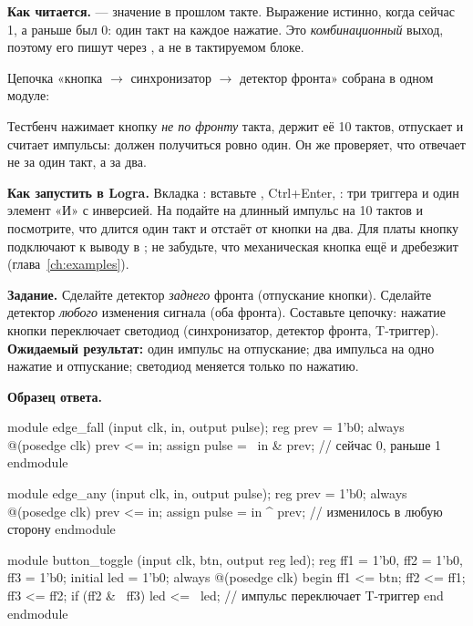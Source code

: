 \textbf{Как читается.}  --- значение  в прошлом такте.
Выражение  истинно, когда сейчас 1, а раньше
был 0: один такт на каждое нажатие. Это \emph{комбинационный} выход,
поэтому его пишут через , а не в тактируемом блоке.

Цепочка «кнопка $\to$ синхронизатор $\to$ детектор фронта» собрана в одном
модуле:


Тестбенч  нажимает кнопку \emph{не по фронту}
такта, держит её 10 тактов, отпускает и считает импульсы: должен получиться
ровно один. Он же проверяет, что  отвечает не за один такт, а за
два.

\textbf{Как запустить в Logra.} Вкладка : вставьте
, Ctrl+Enter, : три триггера и один элемент
«И» с инверсией. На  подайте на  длинный
импульс на 10 тактов и посмотрите, что  длится один такт и
отстаёт от кнопки на два. Для платы кнопку подключают к выводу в
; не забудьте, что механическая кнопка ещё и дребезжит
(глава~\ref{ch:examples}).

\begin{diybox}
\textbf{Задание.}  Сделайте детектор \emph{заднего} фронта
(отпускание кнопки).  Сделайте детектор \emph{любого} изменения
сигнала (оба фронта).  Составьте цепочку: нажатие кнопки переключает
светодиод (синхронизатор, детектор фронта, T-триггер).\\
\textbf{Ожидаемый результат:} один импульс на отпускание; два импульса на одно
нажатие и отпускание; светодиод меняется только по нажатию.
\end{diybox}

\textbf{Образец ответа.}
\begin{vcode}
module edge_fall (input clk, in, output pulse);
    reg prev = 1'b0;
    always @(posedge clk) prev <= in;
    assign pulse = ~in & prev;       // сейчас 0, раньше 1
endmodule

module edge_any (input clk, in, output pulse);
    reg prev = 1'b0;
    always @(posedge clk) prev <= in;
    assign pulse = in ^ prev;        // изменилось в любую сторону
endmodule

module button_toggle (input clk, btn, output reg led);
    reg ff1 = 1'b0, ff2 = 1'b0, ff3 = 1'b0;
    initial led = 1'b0;
    always @(posedge clk) begin
        ff1 <= btn; ff2 <= ff1; ff3 <= ff2;
        if (ff2 & ~ff3) led <= ~led;   // импульс переключает T-триггер
    end
endmodule
\end{vcode}


